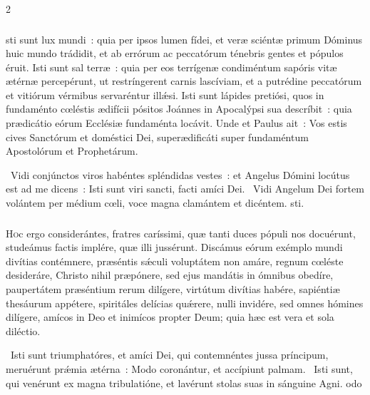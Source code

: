 \documentclass[9pt,twoside]{extarticle}
\begin{document}
\begin{multicols}{2}
{{{\subsubsection*{\center {}}
sti sunt lux mundi~: quia per ipsos lumen fídei, et veræ sciéntæ primum Dóminus huic mundo trádidit, et ab errórum ac peccatórum ténebris gentes et pópulos éruit. Isti sunt sal terræ~: quia per eos terrígenæ condiméntum sapóris vitæ ætérnæ percepérunt, ut restríngerent carnis lascíviam, et a putrédine peccatórum et vitiórum vérmibus servaréntur illǽsi. Isti sunt lápides pretiósi, quos in fundaménto cœléstis ædifícii pósitos Joánnes in Apocalýpsi sua descríbit~: quia prædicátio eórum Ecclésiæ fundaménta locávit. Unde et Paulus ait~: Vos estis cives Sanctórum et doméstici Dei, superædificáti super fundaméntum Apostolórum et Prophetárum.

\begin{tightlist}{}
\item {}~Vidi conjúnctos viros habéntes spléndidas vestes~: et Angelus Dómini locútus est ad me dicens~: \textred{*} Isti sunt viri sancti, facti amíci Dei.
~Vidi Angelum Dei fortem volántem per médium cœli, voce magna clamántem et dicéntem. sti.
\end{tightlist}

\subsubsection*{\center {}}
\lettrine{H}oc ergo considerántes, fratres caríssimi, quæ tanti duces pópuli nos docuérunt, studeámus factis implére, quæ illi jussérunt. Discámus eórum exémplo mundi divítias contémnere, præséntis sǽculi voluptátem non amáre, regnum cœléste desideráre, Christo nihil præpónere, sed ejus mandátis in ómnibus obedíre, paupertátem præséntium rerum dilígere, virtútum divítias habére, sapiéntiæ thesáurum appétere, spiritáles delícias quǽrere, nulli invidére, sed omnes hómines dilígere, amícos in Deo et inimícos propter Deum; quia hæc est vera et sola diléctio.

\begin{tightlist}{}
\item {}~Isti sunt triumphatóres, et amíci Dei, qui contemnéntes jussa príncipum, meruérunt prǽmia ætérna~: \textred{*} Modo coronántur, et accípiunt palmam.
~Isti sunt, qui venérunt ex magna tribulatióne, et lavérunt stolas suas in sánguine Agni. odo
\end{tightlist}

}}}
\end{multicols}
\end{document}

